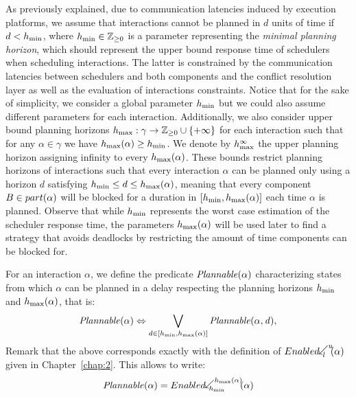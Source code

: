As previously explained, due to communication latencies induced by execution platforms, 
we assume that interactions cannot be planned in $d$ units of time if $d < h_{\min}$, 
where $h_{\min} \in \mathbb{Z}_{\ge 0}$ is a parameter representing the \emph{minimal planning horizon}, 
which should represent the upper bound response time of schedulers when scheduling interactions.
The latter is constrained by the communication latencies between schedulers and both components
and the conflict resolution layer as well as the evaluation of interactions constraints. 
Notice that for the sake of simplicity, we consider a global parameter $h_{\min}$ but 
we could also assume different parameters for each interaction.
Additionally, we also consider upper bound planning horizons 
$h_{\max} : \gamma \to \mathbb{Z}_{\ge 0}\cup\{ +\infty \}$ 
for each interaction such that for any $\alpha\in\gamma$ we have $h_{\max}(\alpha) \geq h_{\min}$.
We denote by $h_{\max}^{\infty}$ the upper planning horizon assigning infinity to every $h_{\max}(\alpha)$.
These bounds restrict planning horizons of interactions such that every interaction $\alpha$ 
can be planned only using a horizon $d$ satisfying $h_{\min} \leq d \leq h_{\max}(\alpha)$,
meaning that every component $B\in part(\alpha)$ will be blocked for a duration in
$[h_{\min},h_{\max}(\alpha)]$ each time $\alpha$ is planned. 
Observe that while $h_{\min}$ represents the worst case estimation of the 
scheduler response time, the parameters $h_{\max}(\alpha)$ will be used later 
to find a strategy that avoids deadlocks by restricting the amount of time components 
can be blocked for.

For an interaction $\alpha$, we define the predicate $\mathit{Plannable(\alpha)}$ 
characterizing states from which $\alpha$ can be planned in a delay respecting 
the planning horizons $h_{\min}$ and $h_{\max}(\alpha)$, that is:
\begin{displaymath}
  \mathit{Plannable(\alpha)}\Leftrightarrow \bigvee_{d\in[h_{\min},h_{\max}(\alpha)]} \mathit{Plannable(\alpha,d)},
\end{displaymath}
Remark that the above corresponds exactly with the definition of $\enabledbackwardb{\alpha}{l}
{u}$ given in Chapter~\ref{chap:2}. This allows to write:
\begin{equation}\label{eq:pln}
 \plntxt{\alpha}=\enabledbackwardb{\alpha}{\hmin}{\hmx}
\end{equation}

